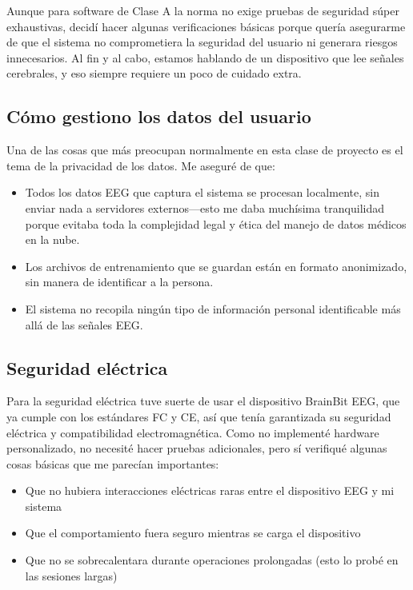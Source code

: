 Aunque para software de Clase A la norma no exige pruebas de seguridad súper exhaustivas, decidí hacer algunas verificaciones básicas porque quería asegurarme de que el sistema no comprometiera la seguridad del usuario ni generara riesgos innecesarios. Al fin y al cabo, estamos hablando de un dispositivo que lee señales cerebrales, y eso siempre requiere un poco de cuidado extra.

\subsection{Cómo gestiono los datos del usuario}

Una de las cosas que más preocupan normalmente en esta clase de proyecto es el tema de la privacidad de los datos. Me aseguré de que:

\begin{itemize}
    \item Todos los datos EEG que captura el sistema se procesan localmente, sin enviar nada a servidores externos—esto me daba muchísima tranquilidad porque evitaba toda la complejidad legal y ética del manejo de datos médicos en la nube.
    \item Los archivos de entrenamiento que se guardan están en formato anonimizado, sin manera de identificar a la persona.
    \item El sistema no recopila ningún tipo de información personal identificable más allá de las señales EEG.
\end{itemize}

\subsection{Seguridad eléctrica}

Para la seguridad eléctrica tuve suerte de usar el dispositivo BrainBit EEG, que ya cumple con los estándares FC y CE, así que tenía garantizada su seguridad eléctrica y compatibilidad electromagnética. Como no implementé hardware personalizado, no necesité hacer pruebas adicionales, pero sí verifiqué algunas cosas básicas que me parecían importantes:

\begin{itemize}
    \item Que no hubiera interacciones eléctricas raras entre el dispositivo EEG y mi sistema
    \item Que el comportamiento fuera seguro mientras se carga el dispositivo
    \item Que no se sobrecalentara durante operaciones prolongadas (esto lo probé en las sesiones largas)
\end{itemize}


